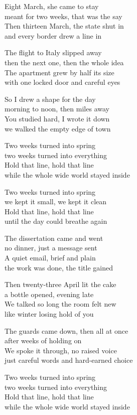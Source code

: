 \begin{lyrics}
Eight March, she came to stay\\
meant for two weeks, that was the say\\
Then thirteen March, the state shut in\\
and every border drew a line in

The flight to Italy slipped away\\
then the next one, then the whole idea\\
The apartment grew by half its size\\
with one locked door and careful eyes

So I drew a shape for the day\\
morning to noon, then miles away\\
You studied hard, I wrote it down\\
we walked the empty edge of town

Two weeks turned into spring\\
two weeks turned into everything\\
Hold that line, hold that line\\
while the whole wide world stayed inside

Two weeks turned into spring\\
we kept it small, we kept it clean\\
Hold that line, hold that line\\
until the day could breathe again

The dissertation came and went\\
no dinner, just a message sent\\
A quiet email, brief and plain\\
the work was done, the title gained

Then twenty-three April lit the cake\\
a bottle opened, evening late\\
We talked so long the room felt new\\
like winter losing hold of you

The guards came down, then all at once\\
after weeks of holding on\\
We spoke it through, no raised voice\\
just careful words and hard-earned choice

Two weeks turned into spring\\
two weeks turned into everything\\
Hold that line, hold that line\\
while the whole wide world stayed inside


\end{lyrics}
